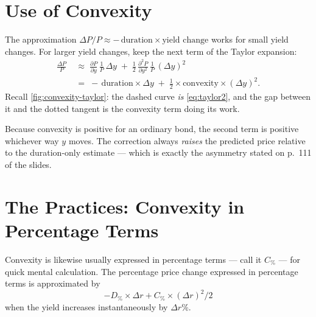 \section{Use of Convexity}


The approximation $\Delta P/P \approx -\,\text{duration}\times\text{yield change}$ works for small yield changes.
For larger yield changes, keep the next term of the Taylor expansion:
\begin{equation}
	\begin{aligned}
		\frac{\Delta P}{P}
		 & \;\approx\; \frac{\partial P}{\partial y}\,\frac{1}{P}\,\Delta y
		\;+\; \frac{1}{2}\,\frac{\partial^{2}P}{\partial y^{2}}\,\frac{1}{P}\,(\Delta y)^{2} \\[2pt]
		 & \;=\; -\,\text{duration}\times\Delta y
		\;+\; \frac{1}{2}\times\text{convexity}\times(\Delta y)^{2} .
	\end{aligned}\label{eq:taylor2}
\end{equation}
Recall \autoref{fig:convexity-taylor}: the dashed curve \emph{is} \eqref{eq:taylor2}, and the gap between it and the dotted tangent is the convexity term doing its work.

\suppstart
\begin{note}
	Because convexity is positive for an ordinary bond, the second term is positive whichever way $y$ moves.
	The correction always \emph{raises} the predicted price relative to the duration-only estimate --- which is exactly the asymmetry stated on p.~111 of the slides.
\end{note}
\suppend

\section{The Practices: Convexity in Percentage Terms}


Convexity is likewise usually expressed in percentage terms --- call it $C_{\%}$ --- for quick mental calculation.
The percentage price change expressed in percentage terms is approximated by
\begin{equation}
	-D_{\%}\times\Delta r + C_{\%}\times(\Delta r)^{2}/2 \label{eq:cpct}
\end{equation}
when the yield increases instantaneously by $\Delta r\%$.

